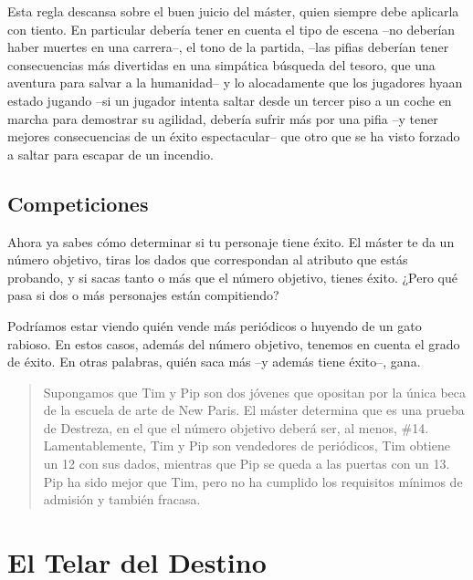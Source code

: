 Esta regla descansa sobre el buen juicio del máster, quien siempre debe aplicarla con tiento. En particular debería tener en cuenta el tipo de escena --no deberían haber muertes en una carrera--, el tono de la partida, --las pifias deberían tener consecuencias más divertidas en una simpática búsqueda del tesoro, que una aventura para salvar a la humanidad-- y lo alocadamente que los jugadores hyaan estado jugando --si un jugador intenta saltar desde un tercer piso a un coche en marcha para demostrar su agilidad, debería sufrir más por una pifia --y tener mejores consecuencias de un éxito espectacular-- que otro que se ha visto forzado a saltar para escapar de un incendio.


\subsection{Competiciones}

Ahora ya sabes cómo determinar si tu personaje tiene éxito. El máster te da
un número objetivo, tiras los dados que correspondan al atributo que estás probando,
y si sacas tanto o más que el número objetivo, tienes éxito. ¿Pero qué pasa
si dos o más personajes están compitiendo?

Podríamos estar viendo quién vende más periódicos o huyendo de un gato rabioso.
En estos casos, además del número objetivo, tenemos en cuenta el grado de éxito.
En otras palabras, quién saca más --y además tiene éxito--, gana.

\begin{quotation}
Supongamos que Tim y Pip son dos jóvenes que opositan por la única beca de la
escuela de arte de New Paris. El máster determina que es una prueba de Destreza,
en el que el número objetivo deberá ser, al menos, \#14. Lamentablemente, Tim y
Pip son vendedores de periódicos, Tim obtiene un 12 con sus dados, mientras que 
Pip se queda a las puertas con un 13. Pip ha sido mejor que Tim, pero no ha cumplido
los requisitos mínimos de admisión y también fracasa.
\end{quotation}


\section{El Telar del Destino}



